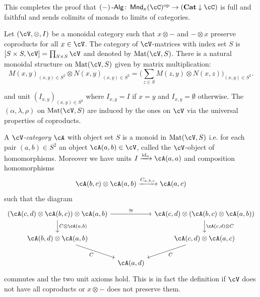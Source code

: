 \documentclass[a4paper,11pt,oneside,openany]{scrbook}
\begin{document}
\begin{rmk}
	This completes the proof that $ (-)\Alg \from \Mnd_\kappa(\cC)^{\text{op}} \to (\Cat\downarrow\cC)$ is full and faithful and sends colimits of monads to limits of categories.
\end{rmk}
Let $ (\cV,\otimes, I) $ be a monoidal category such that $ x\otimes - $ and $ -\otimes x $ preserve coproducts for all $ x\in\cV$.
The category of $\cV$-matrices with index set $ S $ is $ [S\times S,\cV] =\prod_{S\times S}\cV $ and denoted by $ \Mat(\cV ,     S) $. There is a natural monoidal structure on $ \Mat(\cV,S) $ given by matrix multiplication:
\begin{displaymath}
	M(x,y)_{(x,y) \in S^2} \otimes N(x,y)_{(x,y) \in S^2} = \Big(\sum_{z\in S} M(z,y)\otimes N(x,z) \Big)_{(x,y)\in S^2}.
\end{displaymath}

and unit $ (I_{x,y})_{(x,y) \in S^2} $ where $ I_{x,y}= I $ if $ x = y $ and $ I_{x,y} = \emptyset $ otherwise.
The $ (\alpha,\lambda,\rho) $ on $ \Mat(\cV , S) $ are induced by the ones on $\cV$ via the universal properties of coproducts.

\begin{defn}
	A $\cV$\emph{-category} $ \cA $ with object set $ S $ is a monoid in $ \Mat(\cV,S) $
	i.e. for each pair $ (a,b) \in S^2 $ an object $ \cA(a,b) \in\cV$, called the $\cV$-object of homomorphisms.
	Moreover we have units $ I\xrightarrow{\id_a} \cA(a,a) $ and composition homomorphisms
	\begin{displaymath}
		\cA(b,c) \otimes \cA(a,b) \xrightarrow{C_{a,b,c}} \cA(a,c)
	\end{displaymath}
	such that the diagram
	\begin{displaymath}
		\begin{tikzcd}[column sep=tiny]
			(\cA(c,d)\otimes \cA(b,c)) \otimes \cA(a,b)
			\arrow[d,"{C\otimes \cA(a,b)}"]\arrow[rr, "\cong"]
			&&
			\cA(c,d) \otimes (\cA(b,c) \otimes \cA(a,b) )
			\arrow[d,"{\cA(c,d)\otimes C}"]\\
			\cA(b,d)\otimes \cA(a,b)
			\arrow[rd, "C"']
			&&
			\cA(c,d)\otimes \cA(a,c)
			\arrow[ld, "C"]
			\\
			& \cA(a,d)
		\end{tikzcd}
	\end{displaymath}
	commutes and the two unit axioms hold.
	This is in fact the definition if $\cV$ does not have all coproducts or $ x\otimes - $ does not preserve them.
\end{defn}
\end{document}

